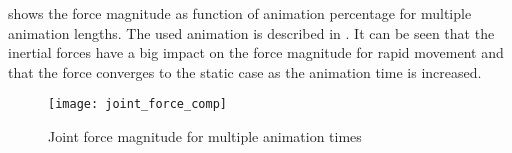  shows the force magnitude as function of animation percentage for multiple animation lengths. The used animation is described in . It can be seen that the inertial forces have a big impact on the force magnitude for rapid movement and that the force converges to the static case as the animation time is increased.


\begin{figure}[h!]
    \centering
    \texttt{[image: joint\_force\_comp]}
    \caption{Joint force magnitude for multiple animation times}
    \label{results}
\end{figure}